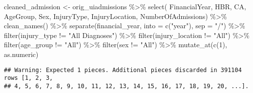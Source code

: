 \documentclass[
]{article}
\newenvironment{Shaded}{\begin{snugshade}}{\end{snugshade}}
\newcommand{\AttributeTok}[1]{\textcolor[rgb]{0.77,0.63,0.00}{#1}}
\newcommand{\DecValTok}[1]{\textcolor[rgb]{0.00,0.00,0.81}{#1}}
\newcommand{\FunctionTok}[1]{\textcolor[rgb]{0.00,0.00,0.00}{#1}}
\newcommand{\NormalTok}[1]{#1}
\newcommand{\OtherTok}[1]{\textcolor[rgb]{0.56,0.35,0.01}{#1}}
\newcommand{\SpecialCharTok}[1]{\textcolor[rgb]{0.00,0.00,0.00}{#1}}
\newcommand{\StringTok}[1]{\textcolor[rgb]{0.31,0.60,0.02}{#1}}
\begin{document}
\begin{Shaded}
\begin{Highlighting}[]
\NormalTok{cleaned\_admission }\OtherTok{\textless{}{-}}\NormalTok{ orig\_uiadmissions }\SpecialCharTok{\%\textgreater{}\%} 
  \FunctionTok{select}\NormalTok{( FinancialYear,}
\NormalTok{        HBR,}
\NormalTok{        CA,}
\NormalTok{        AgeGroup,}
\NormalTok{        Sex,}
\NormalTok{        InjuryType,}
\NormalTok{        InjuryLocation,}
\NormalTok{        NumberOfAdmissions) }\SpecialCharTok{\%\textgreater{}\%}
  \FunctionTok{clean\_names}\NormalTok{()  }\SpecialCharTok{\%\textgreater{}\%} 
  \FunctionTok{separate}\NormalTok{(financial\_year, }\AttributeTok{into =} \FunctionTok{c}\NormalTok{(}\StringTok{"year"}\NormalTok{), }\AttributeTok{sep =} \StringTok{"/"}\NormalTok{) }\SpecialCharTok{\%\textgreater{}\%} 
  \FunctionTok{filter}\NormalTok{(injury\_type }\SpecialCharTok{!=} \StringTok{"All Diagnoses"}\NormalTok{) }\SpecialCharTok{\%\textgreater{}\%} 
  \FunctionTok{filter}\NormalTok{(injury\_location }\SpecialCharTok{!=} \StringTok{"All"}\NormalTok{) }\SpecialCharTok{\%\textgreater{}\%} 
  \FunctionTok{filter}\NormalTok{(age\_group }\SpecialCharTok{!=} \StringTok{"All"}\NormalTok{) }\SpecialCharTok{\%\textgreater{}\%} 
  \FunctionTok{filter}\NormalTok{(sex }\SpecialCharTok{!=} \StringTok{"All"}\NormalTok{) }\SpecialCharTok{\%\textgreater{}\%} 
  \FunctionTok{mutate\_at}\NormalTok{(}\FunctionTok{c}\NormalTok{(}\DecValTok{1}\NormalTok{), as.numeric)}
\end{Highlighting}
\end{Shaded}

\begin{verbatim}
## Warning: Expected 1 pieces. Additional pieces discarded in 391104 rows [1, 2, 3,
## 4, 5, 6, 7, 8, 9, 10, 11, 12, 13, 14, 15, 16, 17, 18, 19, 20, ...].
\end{verbatim}
\end{document}
